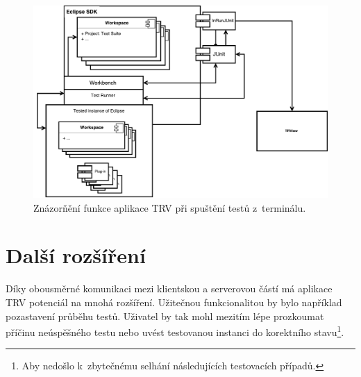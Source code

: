     \begin{figure}
	\includegraphics[width=\textwidth, center]{obrazky-figures/TRV_run_from_term.pdf}
	\caption{Znázorňění funkce aplikace TRV při spuštění testů z~terminálu.}
	\label{fig:TRV_run_from_term}
      \end{figure}

  \section{Další rozšíření}
  Díky obousměrné komunikaci mezi klientskou a serverovou částí má aplikace TRV potenciál na mnohá rozšíření. Užitečnou funkcionalitou by bylo například pozastavení průběhu testů. Uživatel by tak mohl mezitím lépe prozkoumat příčinu neúspěšného testu nebo uvést testovanou instanci do korektního stavu\footnote{Aby nedošlo k~zbytečnému selhání následujících testovacích případů.}. 
  
